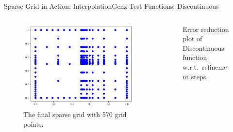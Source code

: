 \begin{frame}{Sparse Grid in Action: Interpolation}{Genz Test Functions: Discontinuous}
    \begin{columns}
        \begin{column}{0.4\textwidth}
            \begin{figure}
                \centering
                \includegraphics[width=\textwidth]{figures/grid_final_disco.pdf}
                \caption{The final sparse grid with 570 grid points.}
            \end{figure}
        \end{column}
        \begin{column}{0.5\textwidth}
            \begin{figure}
                \centering
                \scalebox{0.7}{}
                \caption{Error reduction plot of Discontinuous function w.r.t.\ refinement steps.}
            \end{figure}
        \end{column}
    \end{columns}
\end{frame}

